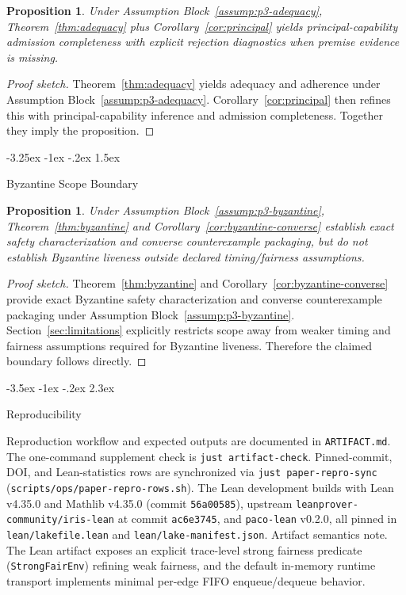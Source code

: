 \documentclass[a4paper,10pt,twocolumn,english]{article}
\makeatletter
\renewcommand{\section}{\@startsection{section}{1}{\z@}%
  {-3.5ex \@plus -1ex \@minus -.2ex}%
  {2.3ex}%
  {\raggedright\normalfont\large\bfseries}}
\renewcommand{\subsection}{\@startsection{subsection}{2}{\z@}%
  {-3.25ex \@plus -1ex \@minus -.2ex}%
  {1.5ex}%
  {\raggedright\normalfont\normalsize\bfseries}}
\numberwithin{equation}{section}
\theoremstyle{paperdef}
\theoremstyle{paperplain}
\newtheorem{proposition}[definition]{Proposition}
\theoremstyle{paperdef}
\theoremstyle{paperremark}
\theoremstyle{paperdef}
\makeatother
\begin{document}
\begin{proposition}
	Under Assumption Block~\ref{assump:p3-adequacy}, Theorem~\ref{thm:adequacy} plus Corollary~\ref{cor:principal} yields principal-capability admission completeness with explicit rejection diagnostics when premise evidence is missing.
\end{proposition}

\begin{proof}[Proof sketch]
	Theorem~\ref{thm:adequacy} yields adequacy and adherence under Assumption Block~\ref{assump:p3-adequacy}. Corollary~\ref{cor:principal} then refines this with principal-capability inference and admission completeness. Together they imply the proposition.
\end{proof}

\subsection{Byzantine Scope Boundary}

\begin{proposition}
	Under Assumption Block~\ref{assump:p3-byzantine}, Theorem~\ref{thm:byzantine} and Corollary~\ref{cor:byzantine-converse} establish exact safety characterization and converse counterexample packaging, but do not establish Byzantine liveness outside declared timing/fairness assumptions.
\end{proposition}

\begin{proof}[Proof sketch]
	Theorem~\ref{thm:byzantine} and Corollary~\ref{cor:byzantine-converse} provide exact Byzantine safety characterization and converse counterexample packaging under Assumption Block~\ref{assump:p3-byzantine}. Section~\ref{sec:limitations} explicitly restricts scope away from weaker timing and fairness assumptions required for Byzantine liveness. Therefore the claimed boundary follows directly.
\end{proof}

\section{Reproducibility}
\label{app:reproducibility}

Reproduction workflow and expected outputs are documented in
\texttt{ARTIFACT.md}. The one-command supplement check is
\texttt{just artifact-check}. Pinned-commit, DOI, and Lean-statistics rows are
synchronized via
\texttt{just paper-repro-sync} (\texttt{scripts/ops/paper-repro-rows.sh}).
The Lean development builds with Lean v4.35.0 and Mathlib v4.35.0
(commit \texttt{56a00585}), upstream \texttt{leanprover-community/iris-lean}
at commit \texttt{ac6e3745}, and \texttt{paco-lean} v0.2.0, all pinned in
\texttt{lean/lakefile.lean} and \texttt{lean/lake-manifest.json}.
Artifact semantics note. The Lean artifact exposes an explicit trace-level
strong fairness predicate (\texttt{StrongFairEnv}) refining weak fairness, and
the default in-memory runtime transport implements minimal per-edge FIFO
enqueue/dequeue behavior.
\end{document}
